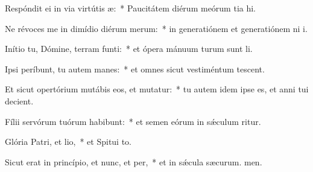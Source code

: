 \item Respóndit ei in via virtútis æ:~* Paucitátem diérum meórum tia hi.
\item Ne révoces me in dimídio diérum merum:~* in generatiónem et generatiónem ni i.
\item Inítio tu, Dómine, terram funti:~* et ópera mánuum turum sunt li.
\item Ipsi períbunt, tu autem manes:~* et omnes sicut vestiméntum tescent.
\item Et sicut opertórium mutábis eos, et mutatur:~* tu autem idem ipse es, et anni tui  decient.
\item Fílii servórum tuórum habibunt:~* et semen eórum in sǽculum ritur.
\item Glória Patri, et lio,~* et Spitui to.
\item Sicut erat in princípio, et nunc, et per,~* et in sǽcula sæcurum. men.
